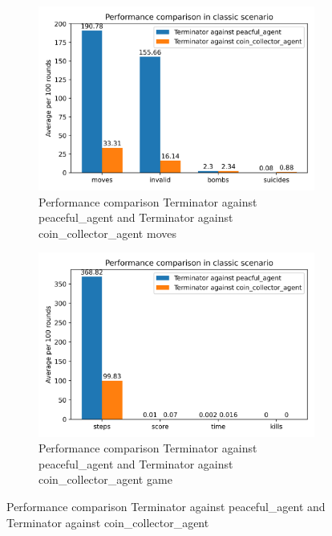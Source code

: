 \documentclass[
	letterpaper, %
	12pt, %
]{CSUniSchoolLabReport}
\begin{document}
\begin{figure}[H]

\begin{subfigure}{\textwidth}
	\centering
	\includegraphics[scale=0.6]{Figures/Task3-1.png}
	\caption{Performance comparison Terminator against peaceful\_agent and Terminator against coin\_collector\_agent moves}
	\label{img:Task3-1}
\end{subfigure}

\begin{subfigure}{\textwidth}
	\centering
	\includegraphics[scale=0.6]{Figures/Task3-2.png}
	\caption{Performance comparison Terminator against peaceful\_agent and Terminator against coin\_collector\_agent game}
	\label{img:Task3-2}
\end{subfigure}

\caption{Performance comparison Terminator against peaceful\_agent and Terminator against coin\_collector\_agent}
\label{img:Task3}

\end{figure}
\end{document}
